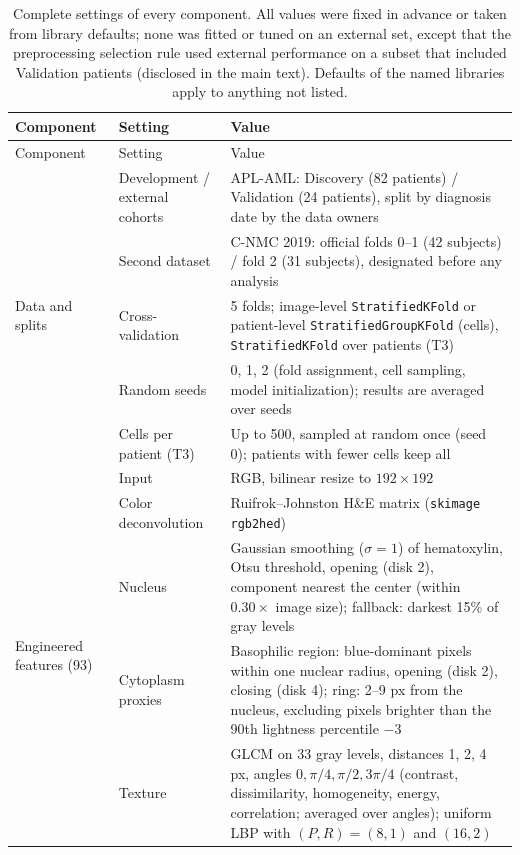 {\footnotesize\setlength{\tabcolsep}{4pt}\renewcommand{\arraystretch}{1.05}
\begin{longtable}{p{3.0cm}p{5.6cm}p{8.3cm}}
\caption{Complete settings of every component. All values were fixed in advance or taken from library defaults; none was fitted or tuned on an external set, except that the preprocessing selection rule used external performance on a subset that included Validation patients (disclosed in the main text). Defaults of the named libraries apply to anything not listed.}\label{tab:hparams}\\
\toprule
Component & Setting & Value \\
\midrule
\endfirsthead
\toprule
Component & Setting & Value \\
\midrule
\endhead
\multirow{5}{3.0cm}{Data and splits} & Development / external cohorts & APL-AML: Discovery (82 patients) / Validation (24 patients), split by diagnosis date by the data owners \\
 & Second dataset & C-NMC 2019: official folds 0--1 (42 subjects) / fold 2 (31 subjects), designated before any analysis \\
 & Cross-validation & 5 folds; image-level \texttt{StratifiedKFold} or patient-level \texttt{StratifiedGroupKFold} (cells), \texttt{StratifiedKFold} over patients (T3) \\
 & Random seeds & 0, 1, 2 (fold assignment, cell sampling, model initialization); results are averaged over seeds \\
 & Cells per patient (T3) & Up to 500, sampled at random once (seed 0); patients with fewer cells keep all \\
\midrule
\multirow{7}{3.0cm}{Engineered features (93)} & Input & RGB, bilinear resize to $192\times192$ \\
 & Color deconvolution & Ruifrok--Johnston H\&E matrix (\texttt{skimage rgb2hed}) \\
 & Nucleus & Gaussian smoothing ($\sigma=1$) of hematoxylin, Otsu threshold, opening (disk 2), component nearest the center (within $0.30\times$ image size); fallback: darkest 15\% of gray levels \\
 & Cytoplasm proxies & Basophilic region: blue-dominant pixels within one nuclear radius, opening (disk 2), closing (disk 4); ring: 2--9 px from the nucleus, excluding pixels brighter than the 90th lightness percentile $-3$ \\
 & Texture & GLCM on 33 gray levels, distances 1, 2, 4 px, angles $0,\pi/4,\pi/2,3\pi/4$ (contrast, dissimilarity, homogeneity, energy, correlation; averaged over angles); uniform LBP with $(P,R)=(8,1)$ and $(16,2)$ \\

\end{longtable}}

